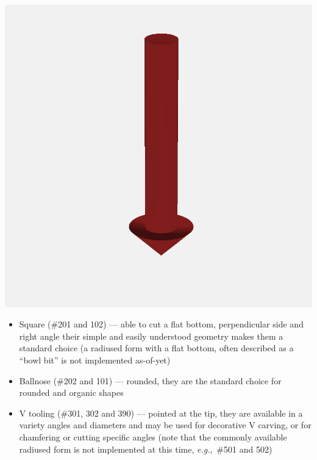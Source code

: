 \documentclass{ltxdoc}
\begin{document}
\begin{samepage}
           \includegraphics[width=\linewidth/3]{images/tool_V_301.png}%

\begin{itemize}
\item Square (\#201 and 102) --- able to cut a flat bottom, perpendicular side and right angle
                                 their simple and easily understood geometry makes them a 
                                 standard choice (a radiused form with a flat bottom, often
                                 described as a ``bowl bit'' is not implemented as-of-yet)
\item Ballnose (\#202 and 101) --- rounded, they are the standard choice for rounded and 
                                   organic shapes
\item V tooling (\#301, 302 and 390) --- pointed at the tip, they are available in a variety
                                         angles and diameters and may be used for decorative
                                         V carving, or for chamfering or cutting specific angles
                                         (note that the commonly available radiused form
                                         is not implemented at this time, \emph{e.g.},~\#501 and 502)
\end{itemize}
\end{samepage}
\end{document}
